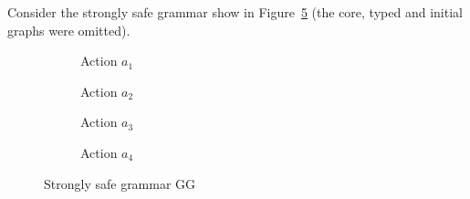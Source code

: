 \begin{example} Consider the strongly safe grammar show in Figure~\ref{fig:process:order} (the core, typed and initial graphs were omitted).

\begin{figure}[!ht]
  \centering
  \begin{subfigure}[t]{.2\textwidth}
    \centerline{}
    \caption{Action $a_1$}\label{fig:process:order:a1}
  \end{subfigure}%
  \begin{subfigure}[t]{.2\textwidth}
    \centerline{}
    \caption{Action $a_2$}\label{fig:process:order:a2}
  \end{subfigure}%
  \begin{subfigure}[t]{.3\textwidth}
    \centerline{}
    \caption{Action $a_3$}\label{fig:process:order:a3}
  \end{subfigure}%
  \begin{subfigure}[t]{.2\textwidth}
    \centerline{}
    \caption{Action $a_4$}\label{fig:process:order:a4}
  \end{subfigure}
  \caption{Strongly safe grammar GG}\label{fig:process:order}
\end{figure}


\end{example}
